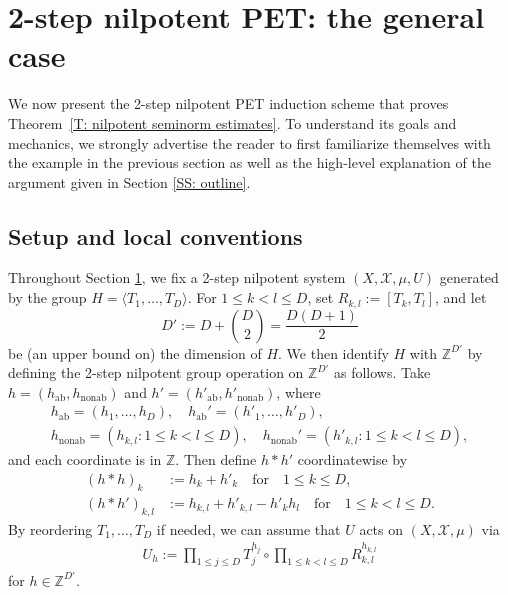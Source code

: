 \documentclass[11pt]{amsart}
\theoremstyle{definition}
\newcommand{\Z}{{\mathbb Z}}
\newcommand{\CX}{{\mathcal X}}
\newcommand{\1}{{\mathbf{1}}}
\newcommand{\ab}{{\mathrm{ab}}}
\newcommand{\nab}{{\mathrm{nonab}}}
\begin{document}
    

\section{2-step nilpotent PET: the general case}\label{S: PET}

We now present the 2-step nilpotent PET induction scheme that proves Theorem~\ref{T: nilpotent seminorm estimates}. To understand its goals and mechanics, we strongly advertise the reader to first familiarize themselves with the example in the previous section as well as the high-level explanation of the argument given in Section \ref{SS: outline}.


\subsection{Setup and local conventions}
Throughout Section \ref{S: PET}, 
 we fix a 2-step nilpotent system $(X, \CX, \mu, U)$ generated by the group $H = \langle T_1, \ldots, T_D\rangle$. 
For $1\leq k<l\leq D$, set $R_{k,l} := [T_k,T_l]$, and let $$D' :=D + \binom{D}{2}=\frac{D(D+1)}{2}$$ be (an upper bound on) the dimension of $H$. We then identify $H$ with $\Z^{D'}$ by defining the 2-step nilpotent group operation on $\Z^{D'}$ as follows. Take $h=(h_\ab,h_\nab)$ and $h'=(h'_\ab,h'_\nab)$, where
\begin{gather*}
 h_\ab = (h_1, \ldots, h_D),\quad h_\ab'= (h'_1, \ldots, h'_D),\\
 h_\nab = (h_{k,l}\colon 1\leq k<l\leq D),\quad h_\nab' = (h'_{k,l}\colon 1\leq k<l\leq D),   
\end{gather*}
and each coordinate is in $\Z$. 
Then define $h*h'$ coordinatewise by 
\begin{align*}
    (h*h)_k &:= h_k + h'_k\quad \textrm{for}\quad 1\leq k\leq D,\\
    (h*h')_{k,l} &:= h_{k,l}+h'_{k,l} -h'_k h_l \quad \textrm{for}\quad 1\leq k<l\leq D.
\end{align*}
By reordering $T_1, \ldots, T_D$ if needed, we can assume that $U$ acts on $(X, \CX, \mu)$ via
\begin{align}\label{E: group representation}
    U_h := \prod_{1\leq j\leq D} T_j^{h_{j}} \circ \prod_{1\leq k<l\leq D} R_{k,l}^{h_{k,l}}
\end{align}
for $h\in\Z^{D'}$.
\end{document}
